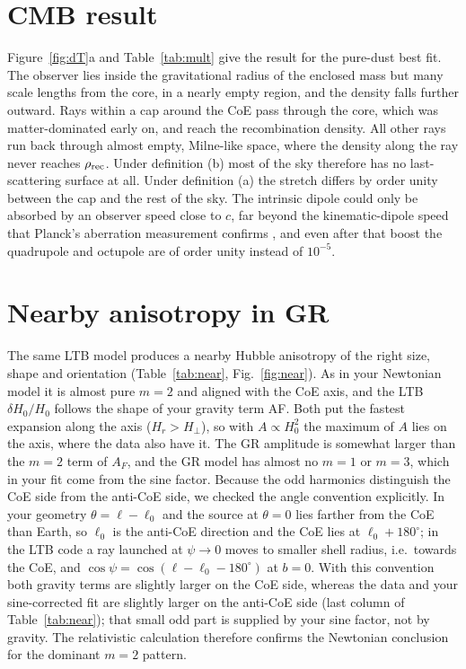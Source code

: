 \documentclass[10pt,twocolumn,letterpaper]{article}
\begin{document}
\section{CMB result}
Figure~\ref{fig:dT}a and Table~\ref{tab:mult} give the result for the pure-dust best fit. The observer lies inside the gravitational radius of the enclosed mass but many scale lengths from the core, in a nearly empty region, and the density falls further outward. Rays within a cap around the CoE pass through the core, which was matter-dominated early on, and reach the recombination density. All other rays run back through almost empty, Milne-like space, where the density along the ray never reaches $\rho_{\rm rec}$. Under definition (b) most of the sky therefore has no last-scattering surface at all. Under definition (a) the stretch differs by order unity between the cap and the rest of the sky. The intrinsic dipole could only be absorbed by an observer speed close to $c$, far beyond the kinematic-dipole speed that Planck's aberration measurement confirms \cite{Planck2013XXVII}, and even after that boost the quadrupole and octupole are of order unity instead of $10^{-5}$.



\section{Nearby anisotropy in GR}
The same LTB model produces a nearby Hubble anisotropy of the right size, shape and orientation (Table~\ref{tab:near}, Fig.~\ref{fig:near}). As in your Newtonian model it is almost pure $m=2$ and aligned with the CoE axis, and the LTB $\delta H_0/H_0$ follows the shape of your gravity term AF. Both put the fastest expansion along the axis ($H_r>H_\perp$), so with $A\propto H_0^2$ the maximum of $A$ lies on the axis, where the data also have it. The GR amplitude is somewhat larger than the $m=2$ term of $A_F$, and the GR model has almost no $m=1$ or $m=3$, which in your fit come from the sine factor. Because the odd harmonics distinguish the CoE side from the anti-CoE side, we checked the angle convention explicitly. In your geometry $\theta=\ell-\ell_0$ and the source at $\theta=0$ lies farther from the CoE than Earth, so $\ell_0$ is the anti-CoE direction and the CoE lies at $\ell_0+180^\circ$; in the LTB code a ray launched at $\psi\to0$ moves to smaller shell radius, i.e.\ towards the CoE, and $\cos\psi=\cos(\ell-\ell_0-180^\circ)$ at $b=0$. With this convention both gravity terms are slightly larger on the CoE side, whereas the data and your sine-corrected fit are slightly larger on the anti-CoE side (last column of Table~\ref{tab:near}); that small odd part is supplied by your sine factor, not by gravity. The relativistic calculation therefore confirms the Newtonian conclusion for the dominant $m=2$ pattern.
\end{document}
